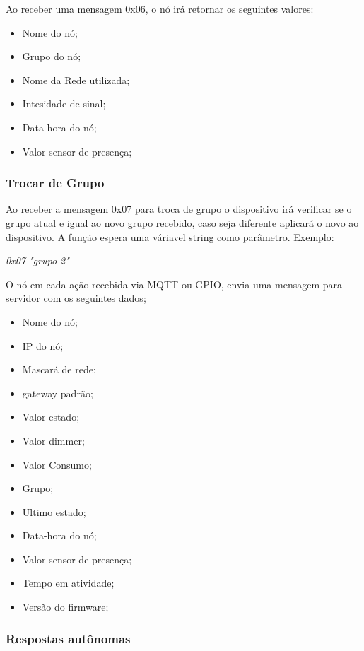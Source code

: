 \documentclass[openright]{normas-utf-tex} %
\begin{document}
Ao receber uma mensagem 0x06, o nó irá retornar os seguintes valores:

\begin{itemize}
    \item Nome do nó;
    \item Grupo do nó;
    \item Nome da Rede utilizada;
    \item Intesidade de sinal;
    \item Data-hora do nó;
    \item Valor sensor de presença;
\end{itemize}

\subsubsection{Trocar de Grupo}
Ao receber a mensagem 0x07 para troca de grupo o dispositivo irá verificar se o grupo atual e igual ao novo grupo recebido, caso seja diferente aplicará o novo ao dispositivo.
A função espera uma váriavel string\cite{Altabooks} como parâmetro.
Exemplo:
\begin{center}
    \textit{
    0x07 "grupo 2"
    }
\end{center}

O nó em cada ação recebida via MQTT ou GPIO,  envia uma mensagem para servidor com os seguintes dados;

\begin{itemize}
    \item Nome do nó;
    \item IP do nó;
    \item Mascará de rede;
    \item gateway padrão;
    \item Valor estado;
    \item Valor dimmer;
    \item Valor Consumo;
    \item Grupo;
    \item Ultimo estado;
    \item Data-hora do nó;
    \item Valor sensor de presença;
    \item Tempo em atividade;
    \item Versão do firmware;
\end{itemize}

\subsubsection{Respostas autônomas}
\end{document}
